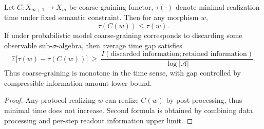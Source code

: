 \begin{theorem}\label{thm:xi-time-monotone-under-coarse-graining}
Let \(C:X_{m+1}\to X_m\) be coarse-graining functor, \(\tau(\cdot)\) denote minimal realization time under fixed semantic constraint.
Then for any morphism \(w\),
\[
\tau(C(w))\le \tau(w).
\]
If under probabilistic model coarse-graining corresponds to discarding some observable sub-\(\sigma\)-algebra, then average time gap satisfies
\[
\mathbb E\!\bigl[\tau(w)-\tau(C(w))\bigr]
\ \ge\
\frac{I(\text{discarded information};\text{retained information})}{\log|\mathcal A|}.
\]
Thus coarse-graining is monotone in the time sense, with gap controlled by compressible information amount lower bound.
\end{theorem}

\begin{proof}
Any protocol realizing \(w\) can realize \(C(w)\) by post-processing, thus minimal time does not increase.
Second formula is obtained by combining data processing and per-step readout information upper limit.
\end{proof}
